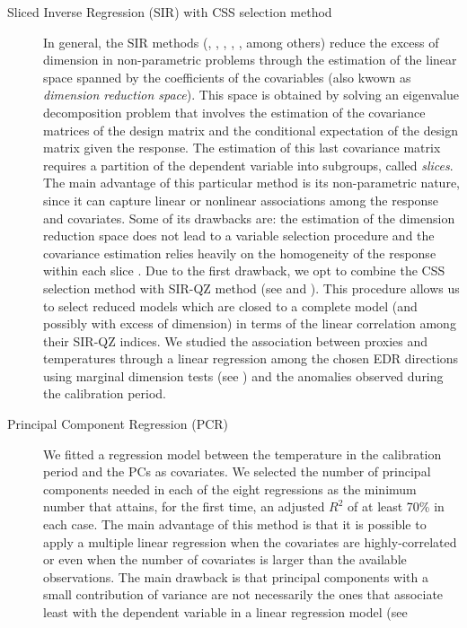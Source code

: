 \documentclass[11pt]{amsart}
\theoremstyle{plain}
\theoremstyle{definition}
\theoremstyle{remark}
\begin{document}
\begin{description}
\item[Sliced Inverse Regression (SIR) with CSS selection method]
  In general, the SIR methods (\cite{Li1991},
  \cite{Duan1991}, \cite{Zhong2005}, \cite{Li2008}, \cite{Coudret2014}, \cite{Weisberg2002} among
  others) reduce the excess of dimension in non-parametric problems through the
  estimation of the linear space spanned by the coefficients of the covariables
  (also kwown as \textit{dimension reduction space}).
  This space is obtained by solving an eigenvalue decomposition problem that
  involves the estimation of the covariance matrices of the design matrix and
  the conditional expectation of the design matrix given the response. The
  estimation of this last covariance matrix requires a partition of the dependent variable into subgroups, called \textit{slices}.
  The main advantage of this particular method is its non-parametric nature,
  since it can capture linear or nonlinear associations among the response and
  covariates. Some of its drawbacks are: the estimation of the dimension
  reduction space does not lead to a variable selection procedure and the
  covariance estimation relies heavily on the homogeneity of the response within
  each slice \cite{Wu2010}. Due to the first drawback, we opt to combine the CSS
  selection method with SIR-QZ method (see
  \cite{Coudret2014} and \cite{Coudret2017}). This procedure allows us to select
  reduced models which are closed to a complete model (and possibly with excess
  of dimension) in terms of the linear correlation among their SIR-QZ indices. 
  We studied the association between proxies and temperatures
  through a linear regression among the chosen EDR directions using marginal
  dimension tests (see \cite{Cook2004}) and the anomalies observed
  during the calibration period. 
\item[Principal Component Regression (PCR)]
We fitted a regression model between the temperature in the calibration period and the PCs
as covariates. We selected the number of principal components needed in each of
the eight regressions as the minimum number that attains, for the first time, an adjusted
$R^2$ of at least 70\% in each case. The main advantage of this method is that
it is possible to apply a multiple linear regression when the covariates are
highly-correlated or even when the number of covariates is larger than the
available observations. The main drawback is that principal components
with a small contribution of variance are not necessarily the ones that
associate least with the dependent variable in a linear regression model (see

\end{description}
\end{document}
